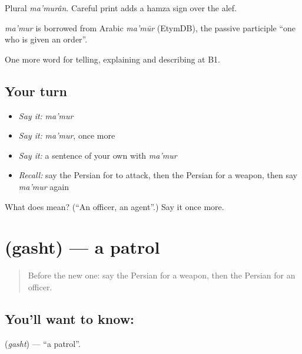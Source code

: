 Plural \emph{ma'murân}. Careful print adds a hamza sign over the alef.

\begin{cousinweb}
\emph{ma'mur} is borrowed from Arabic \emph{ma'mūr} (EtymDB), the passive participle \textquotedblleft{}one who is given an order\textquotedblright{}.
\end{cousinweb}

\begin{grammarlens}[title={What you've built}]
One more word for telling, explaining and describing at B1.
\end{grammarlens}

\subsection*{Your turn}
\begin{itemize}
\raggedright
  \item \emph{Say it:} \emph{ma'mur}
  \item \emph{Say it:} \emph{ma'mur}, once more
  \item \emph{Say it:} a sentence of your own with \emph{ma'mur}
  \item \emph{Recall:} say the Persian for to attack, then the Persian for a weapon, then say \emph{ma'mur} again
\end{itemize}

\begin{tcolorbox}[breakable,colback=teal!4,colframe=teal!35!black,title={Before you move on}]
What does  mean? (\textquotedblleft{}An officer, an agent\textquotedblright{}.) Say it once more.
\end{tcolorbox}
\section[\texorpdfstring{\fa{گشت} (gasht)}{گشت (gasht)}]{ (gasht) — a patrol}

\label{lesson:FA-C319-gasht}



\begin{quote}
Before the new one: say the Persian for a weapon, then the Persian for an officer.
\end{quote}

\subsection*{You'll want to know: }
\textbf{} (\emph{gasht}) — \textquotedblleft{}a patrol\textquotedblright{}.

